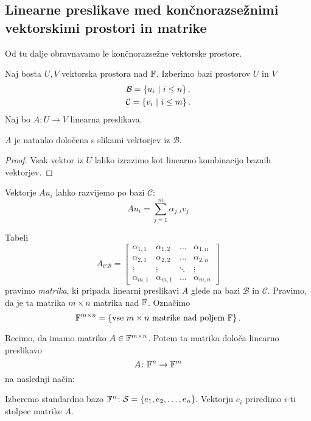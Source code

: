 \documentclass[12pt, a4paper]{article}
\begin{document}
\subsection{Linearne preslikave med končnorazsežnimi vektorskimi prostori in matrike}

Od tu dalje obravnavamo le končnorazsežne vektorske prostore.

Naj bosta $U,V$ vektorska prostora nad $\mathbb{F}$. Izberimo bazi prostorov $U$ in $V$
\begin{gather*}
\mathcal{B}=\left\{u_i~\middle\vert~i\leq n\right\},
\\
\mathcal{C}=\left\{v_i~\middle\vert~i\leq m\right\}.
\end{gather*}
Naj bo $A\colon U\to V$ linearna preslikava.

\begin{trditev}
$A$ je natanko določena s slikami vektorjev iz $\mathcal{B}$.
\end{trditev}

\begin{proof}
Vsak vektor iz $U$ lahko izrazimo kot linearno kombinacijo baznih vektorjev.
\end{proof}
Vektorje $Au_i$ lahko razvijemo po bazi $\mathcal{C}$:
\[
Au_i=\sum_{j=1}^m\alpha_{j,i}v_j
\]

\begin{okvir}
\begin{definicija}
Tabeli
\[
A_{\mathcal{CB}}=
\begin{bmatrix}
\alpha_{1,1} & \alpha_{1,2} & \dots & \alpha_{1,n} \\
\alpha_{2,1} & \alpha_{2,2} & \dots & \alpha_{2,n} \\
\vdots & \vdots & \ddots & \vdots \\
\alpha_{m,1} & \alpha_{m,1} & \dots & \alpha_{m,n}
\end{bmatrix} 
\]
pravimo \emph{matrika}, ki pripada linearni preslikavi $A$ glede na bazi $\mathcal{B}$ in $\mathcal{C}$. Pravimo, da je ta matrika $m\times n$ matrika nad $\mathbb{F}$. Označimo
\[
\mathbb{F}^{m\times n}=\left\{\text{vse $m\times n$ matrike nad poljem $\mathbb{F}$}\right\}.
\]
\end{definicija}
\end{okvir}

Recimo, da imamo matriko $A\in\mathbb{F}^{m\times n}$. Potem ta matrika določa linearno preslikavo
\[
A\colon\mathbb{F}^n\to\mathbb{F}^m
\]
na naslednji način:

Izberemo standardno bazo $\mathbb{F}^n\colon\mathcal{S}=\left\{e_1,e_2,\dots,e_n\right\}$. Vektorju $e_i$ priredimo $i$-ti stolpec matrike $A$.
\end{document}
